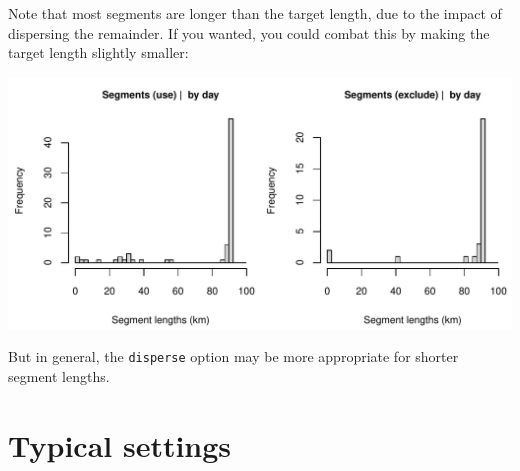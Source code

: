 \documentclass[
]{book}
\newenvironment{Shaded}{\begin{snugshade}}{\end{snugshade}}
\newcommand{\AttributeTok}[1]{\textcolor[rgb]{0.13,0.29,0.53}{#1}}
\newcommand{\CommentTok}[1]{\textcolor[rgb]{0.56,0.35,0.01}{\textit{#1}}}
\newcommand{\ConstantTok}[1]{\textcolor[rgb]{0.56,0.35,0.01}{#1}}
\newcommand{\DecValTok}[1]{\textcolor[rgb]{0.00,0.00,0.81}{#1}}
\newcommand{\FunctionTok}[1]{\textcolor[rgb]{0.13,0.29,0.53}{\textbf{#1}}}
\newcommand{\NormalTok}[1]{#1}
\newcommand{\OtherTok}[1]{\textcolor[rgb]{0.56,0.35,0.01}{#1}}
\newcommand{\SpecialCharTok}[1]{\textcolor[rgb]{0.81,0.36,0.00}{\textbf{#1}}}
\newcommand{\StringTok}[1]{\textcolor[rgb]{0.31,0.60,0.02}{#1}}
\begin{document}
Note that most segments are longer than the target length, due to the impact of dispersing the remainder. If you wanted, you could combat this by making the target length slightly smaller:

\begin{Shaded}
\end{Shaded}

\includegraphics{figures/unnamed-chunk-404-1.pdf}

But in general, the \texttt{disperse} option may be more appropriate for shorter segment lengths.

\hypertarget{typical-settings}{%
\section*{Typical settings}\label{typical-settings}}
\end{document}
